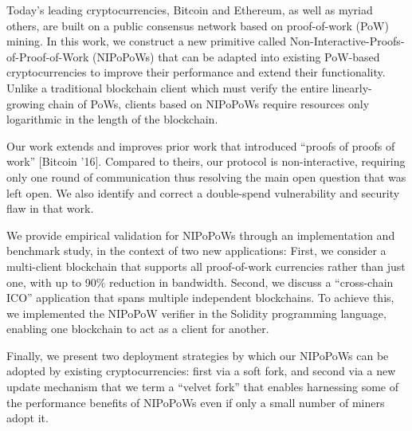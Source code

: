Today's leading cryptocurrencies, Bitcoin and Ethereum, as well as myriad others, are built on a public consensus network based on proof-of-work (PoW) mining. In this work, we construct a new primitive called Non-Interactive-Proofs-of-Proof-of-Work (NIPoPoWs) that can be adapted into existing PoW-based cryptocurrencies to improve their performance and extend their functionality.
Unlike a traditional blockchain client
which must verify the entire linearly-growing chain of PoWs, clients based on
NIPoPoWs require resources only logarithmic in the length of the blockchain.

Our work  extends and improves prior work that introduced ``proofs of proofs of work'' [Bitcoin '16]. Compared to theirs, our protocol is non-interactive, requiring only one round of communication thus resolving the main open question that was left open. We also identify and correct a double-spend vulnerability and security flaw in that work. %

We provide empirical validation for NIPoPoWs through an implementation and
benchmark study, in the context of two new applications: First, we consider a
multi-client blockchain that supports all proof-of-work currencies rather than
just one, with up to 90\% reduction in bandwidth.  Second, we discuss a
``cross-chain ICO'' application that spans multiple independent blockchains. To
achieve this, we implemented the NIPoPoW verifier in the Solidity programming
language, enabling one blockchain to act as a client for another.

Finally, we present two deployment strategies by which our NIPoPoWs can be adopted by existing cryptocurrencies: first via a soft fork, and second via a new update mechanism that we
term a ``velvet fork'' that enables harnessing some of the performance benefits
of NIPoPoWs even if only a small number of miners adopt it.
